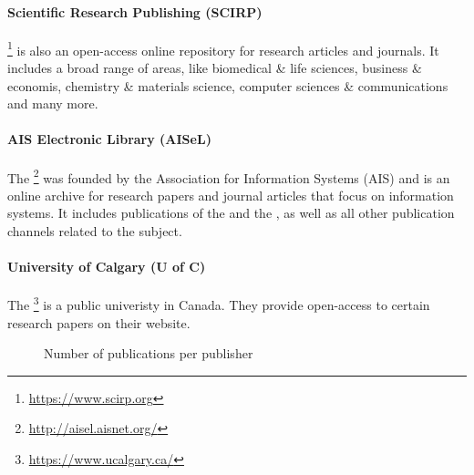 \paragraph{Scientific Research Publishing (SCIRP)} \footnote{\url{https://www.scirp.org}} is also an open-access online repository for research articles and journals. It includes a broad range of areas, like biomedical \& life sciences, business \& economis, chemistry \& materials science, computer sciences \& communications and many more.
\paragraph{AIS Electronic Library (AISeL)} The \footnote{\url{http://aisel.aisnet.org/}} was founded by the Association for Information Systems (AIS) and is an online archive for research papers and journal articles that focus on information systems. It includes publications of the  and the , as well as all other publication channels related to the subject.
\paragraph{University of Calgary (U of C)} The \footnote{\url{https://www.ucalgary.ca/}} is a public univeristy in Canada. They provide open-access to certain research papers on their website.

\begin{figure}[!ht]
	\centering
	\caption{Number of publications per publisher} 	
	\label{graph:rq1_publishers}
\end{figure}



\clearpage
